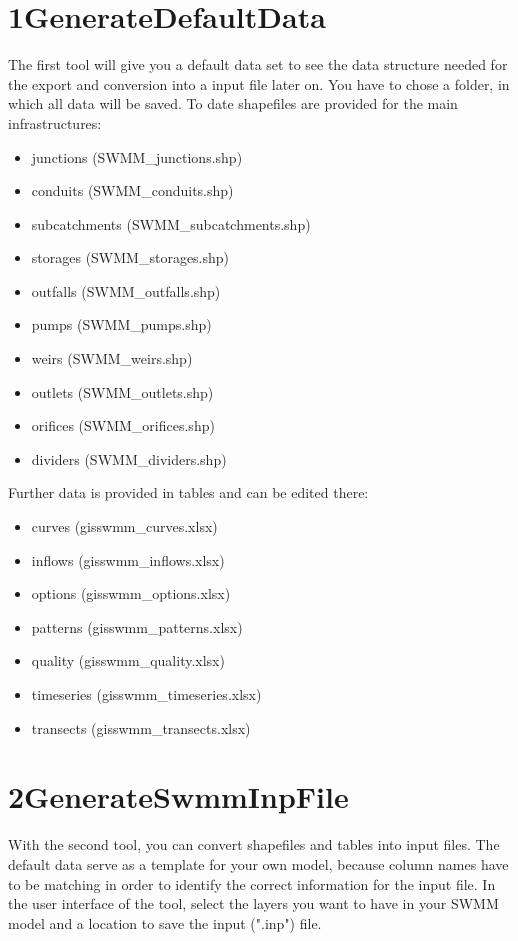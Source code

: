 \documentclass[10pt,a4paper,oneside]{scrbook}
\begin{document}
\section{1\textunderscore GenerateDefaultData}
The first tool will give you a default data set to see the data structure needed for the export and conversion into a input file later on. You have to chose a folder, in which all data will be saved.  To date shapefiles are provided for the main infrastructures:
\begin{itemize}
	\setlength\itemsep{0pt}
    \item junctions (SWMM\_junctions.shp)
    \item conduits (SWMM\_conduits.shp)
    \item subcatchments (SWMM\_subcatchments.shp)
    \item storages (SWMM\_storages.shp)
    \item outfalls (SWMM\_outfalls.shp)
    \item pumps (SWMM\_pumps.shp)
    \item weirs (SWMM\_weirs.shp)
    \item outlets (SWMM\_outlets.shp)
    \item orifices (SWMM\_orifices.shp)
    \item dividers (SWMM\_dividers.shp)
\end{itemize}
Further data is provided in tables and can be edited there:
\begin{itemize}
	\setlength\itemsep{0pt}
    \item curves (gisswmm\_curves.xlsx)
    \item inflows (gisswmm\_inflows.xlsx)
    \item options (gisswmm\_options.xlsx)
    \item patterns (gisswmm\_patterns.xlsx)
    \item quality (gisswmm\_quality.xlsx)
    \item timeseries (gisswmm\_timeseries.xlsx)
    \item transects (gisswmm\_transects.xlsx)
\end{itemize}

\section{2\textunderscore GenerateSwmmInpFile}
With the second tool, you can convert shapefiles and tables into input files. The default data serve as a template for your own model, because column names have to be matching in order to identify the correct information for the input file.
In the user interface of the tool, select the layers you want to have in your SWMM model and a location to save the input (".inp") file.
\end{document}
